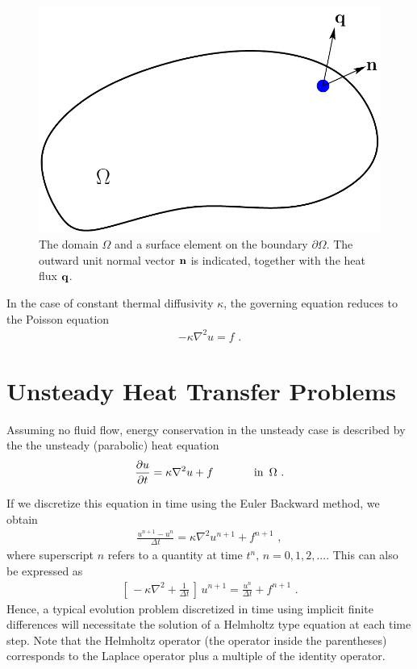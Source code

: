 \documentclass[11pt]{article}
\begin{document}
\begin{figure}[htbp]
  \begin{center}
    \includegraphics[scale=0.5]{HeatFlux}
  \end{center}
\caption{The domain $\Omega$ and a surface element on the boundary
$\partial\Omega$. The outward unit normal vector ${\bf n}$ is indicated, 
together with the heat flux ${\bf q}$. 
}
\label{fig:HeatFlux}
\end{figure}
\vspace{.1in}

In the case of constant thermal diffusivity $\kappa$, 
the governing equation reduces to the Poisson equation
\begin{eqnarray}
\label{steady-heat}
- \kappa\nabla^2 u = f \,\, .
\end{eqnarray}

\section {Unsteady Heat Transfer Problems}

Assuming no fluid flow, energy 
conservation in the unsteady case is described by the 
the unsteady (parabolic) heat equation
\begin{eqnarray}
\label{heat-eq}
\frac{\partial u}{\partial t} 
=  \kappa \nabla^2 u + f \hspace{0.5in}\mathrm{in}\,\,\,\Omega \,\, .
\end{eqnarray}

If we discretize this equation in time 
using the Euler Backward method, we obtain
\begin{eqnarray}
\frac{u^{n+1}- u^n}{\Delta t} 
= \kappa\nabla^2 u^{n+1} + f^{n+1} \,\, ,
\end{eqnarray}
where superscript $n$ refers to a quantity at time $t^n,\, n=0,1,2,...$.
This can also be expressed as 
\begin{eqnarray}
\label{helm-eq}
\left[\, - \kappa\nabla^2 +\frac{1}{\Delta t} \, \right]\, u^{n+1} = 
\frac{u^n}{\Delta t} + f^{n+1} \,\, .
\end{eqnarray}
Hence, a typical evolution problem discretized in time
using implicit finite differences will necessitate the solution of a 
Helmholtz type equation at each time step. Note that the 
Helmholtz operator (the operator inside the parentheses) 
corresponds to the Laplace operator plus a multiple of the identity operator.
\end{document}
